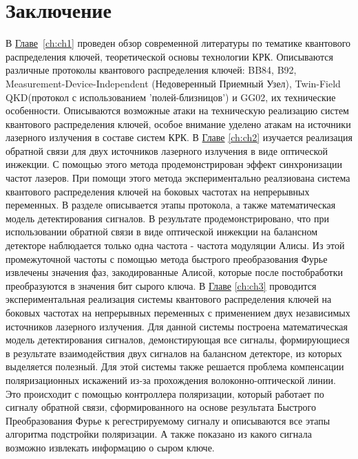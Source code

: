 \chapter*{Заключение}                       %
В \underline{Главе}~\ref{ch:ch1} проведен обзор современной литературы по тематике квантового распределения ключей, теоретической основы технологии КРК. Описываются различные протоколы квантового распределения ключей: BB84, B92, Measurement-Device-Independent (Недоверенный Приемный Узел), Twin-Field QKD(протокол с использованием 'полей-близницов') и GG02, их технические особенности.
Описываются возможные атаки на техническую реализацию систем квантового распределения ключей, особое внимание уделено атакам на источники лазерного излучения в составе систем КРК.
\newline В \underline{Главе} \ref{ch:ch2} изучается реализация обратной связи для двух источников лазерного излучения в виде оптической инжекции. С помощью этого метода продемонстрирован эффект синхронизации частот лазеров. При помощи этого метода экспериментально реалзиована система квантового распределения ключей на боковых частотах на непрерывных переменных.
В разделе описывается этапы протокола, а также математическая модель детектирования сигналов. В результате продемонстрировано, что при использовании обратной связи в виде оптической инжекции на балансном детекторе наблюдается только одна частота - частота модуляции Алисы. Из этой промежуточной частоты с помощью метода быстрого преобразования Фурье извлечены значения фаз, закодированные Алисой, которые после постобработки преобразуются в значения бит сырого ключа.
\newline В \underline{Главе} \ref{ch:ch3} проводится экспериментальная реализация системы квантового распределения ключей на боковых частотах на непрерывных переменных с применением двух независимых источников лазерного излучения. Для данной системы построена математическая модель детектирования сигналов, демонстирующая все сигналы, формирующиеся в результате взаимодействия двух сигналов на балансном детекторе, из которых выделяется полезный.
Для этой системы также решается проблема компенсации поляризационных искажений из-за прохождения волоконно-оптической линии. Это происходит с помощью контроллера поляризации, который работает по сигналу обратной связи, сформированного на основе результата Быстрого Преобразования Фурье к регестрируемому сигналу и описываются все этапы алгоритма подстройки поляризации. А также показано из какого сигнала возможно извлекать информацию о сыром ключе.
